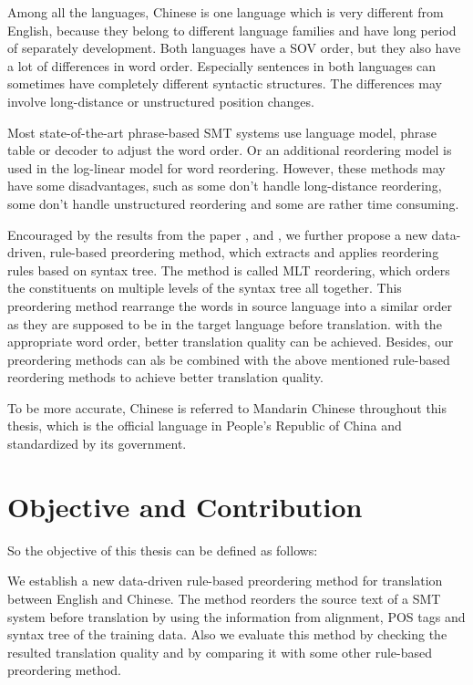 Among all the languages, Chinese is one language which is very different from English, because they belong to different language families and have long period of separately development. Both languages have a \ac{SOV} order, but they also have a lot of differences in word order. Especially sentences in both languages can sometimes have completely different syntactic structures. The differences may involve long-distance or unstructured position changes.

Most state-of-the-art phrase-based \ac{SMT} systems use language model, phrase table or decoder to adjust the word order. Or an additional reordering model is used in the log-linear model for word reordering. However, these methods may have some disadvantages, such as some don't handle long-distance reordering, some don't handle unstructured reordering and some are rather time consuming.

Encouraged by the results from the paper \cite{short}, \cite{long} and \cite{tree}, we further propose a new data-driven, rule-based preordering method, which extracts and applies reordering rules based on syntax tree. The method is called \ac{MLT} reordering, which orders the constituents on multiple levels of the syntax tree all together. This preordering method rearrange the words in source language into a similar order as they are supposed to be in the target language before translation. with the appropriate word order, better translation quality can be achieved. Besides, our preordering methods can als be combined with the above mentioned rule-based reordering methods to achieve better translation quality. 

To be more accurate, Chinese is referred to Mandarin Chinese throughout this thesis, which is the official language in People's Republic of China and standardized by its government.

\section{Objective and Contribution}
\label{ch:Introduction:sec:ObjectiveAndContribution}

So the objective of this thesis can be defined as follows:

\begin{center}
\parbox[c]{0.8\textwidth}{
We establish a new data-driven rule-based preordering method for translation between English and Chinese. The method reorders the source text of a \ac{SMT} system before translation by using the information from alignment, \ac{POS} tags and syntax tree of the training data. Also we evaluate this method by checking the resulted translation quality and by comparing it with some other rule-based preordering method.
}
\end{center}

